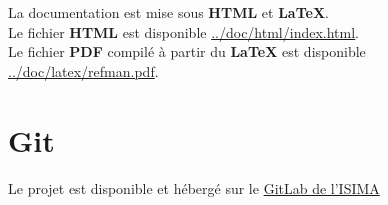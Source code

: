 \documentclass[11pt]{article}
\begin{document}
La documentation est mise sous \textbf{HTML} et \textbf{\LaTeX{}}.\\

Le fichier \textbf{HTML} est disponible \href{/home/hozen/cur/projet-java/doc/html/index.html}{../doc/html/index.html}.\\

Le fichier \textbf{PDF} compilé à partir du \textbf{\LaTeX{}} est disponible \href{/home/hozen/cur/projet-java/doc/latex/refman.pdf}{../doc/latex/refman.pdf}.\\

\section{Git\label{org4e72442}}
\label{sec:org46f89e1}

Le projet est disponible et hébergé sur le \href{https://gitlab.isima.fr}{GitLab de l'ISIMA}\\

\newpage
\listoffigures
\end{document}
